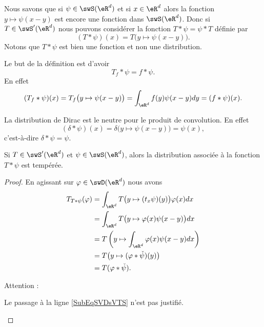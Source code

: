 Nous savons que si \( \psi\in\swS(\eR^d)\) et si \( x\in\eR^d\) alors la fonction \( y\mapsto\psi(x-y)\) est encore une fonction dans \( \swS(\eR^d)\). Donc si \( T\in\swS'(\eR^d)\) nous pouvons considérer la fonction \( T*\psi=\psi*T\) définie par
\begin{equation}        \label{EQooOUXKooGHDSzL}
	(T*\psi)(x)=T\big( y\mapsto\psi(x-y) \big).
\end{equation}
Notons que \( T*\psi\) est bien une fonction et non une distribution.

Le but de la définition est d'avoir
\begin{equation}
	T_f*\psi=f*\psi.
\end{equation}
En effet
\begin{equation}
	(T_f*\psi)(x)=T_f\big( y\mapsto \psi(x-y) \big)=\int_{\eR^d}f(y)\psi(x-y)dy=(f*\psi)(x).
\end{equation}

\begin{example}
	La distribution de Dirac est le neutre pour le produit de convolution. En effet
	\begin{equation}
		(\delta*\psi)(x)=\delta\big( y\mapsto\psi(x-y) \big)=\psi(x),
	\end{equation}
	c'est-à-dire \( \delta*\psi=\psi\).
\end{example}

\begin{proposition} \label{PropZMKYMKI}
	Si \( T\in\swS'(\eR^d)\) et \( \psi\in\swS(\eR^d)\), alors la distribution associée à la fonction \( T*\psi\) est tempérée.
\end{proposition}

\begin{proof}
	En agissant sur \( \varphi\in\swD(\eR^d)\) nous avons
	\begin{subequations}
		\begin{align}
			T_{T*\psi}(\varphi) & =\int_{\eR^d}T\big( y\mapsto (t_x\psi)(y) \big)\varphi(x)dx                         \\
			                    & =\int_{\eR^d}T\big( y\mapsto \varphi(x)\psi(x-y) \big)dx                            \\
			                    & =T\left( y\mapsto\int_{\eR^d}\varphi(x)\psi(x-y)dx \right)     \label{SubEqSVDsVTS} \\
			                    & =T\big(y\mapsto (\varphi*\check\psi)(y)\big)                                        \\
			                    & =T(\varphi*\check\psi).
		\end{align}
	\end{subequations}

	Attention :
	\begin{probleme}
		Le passage à la ligne \eqref{SubEqSVDsVTS} n'est pas justifié.
	\end{probleme}
\end{proof}

